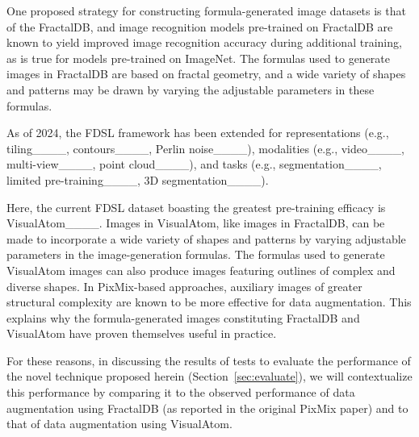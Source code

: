 One proposed strategy for constructing
formula-generated image datasets is that
of the FractalDB, and image recognition
models pre-trained on FractalDB are known to yield improved
image recognition accuracy during additional training,
as is true for models pre-trained on ImageNet.
The formulas used to generate images in FractalDB
are based on fractal geometry, and
a wide variety of shapes and patterns may be drawn
by varying the adjustable parameters in these formulas.

As of 2024, the FDSL framework has been extended for representations (e.g., tiling____, contours____, Perlin noise____), modalities (e.g., video____, multi-view____, point cloud____), and tasks (e.g., segmentation____, limited pre-training____, 3D segmentation____). 

Here, the current FDSL dataset boasting the
greatest pre-training efficacy is VisualAtom____.
Images in VisualAtom, like images in FractalDB,
can be made to incorporate a wide variety
of shapes and patterns by varying adjustable parameters
in the image-generation formulas.
The formulas used to generate VisualAtom images
can also produce images featuring outlines of
complex and diverse shapes.
In PixMix-based approaches,
auxiliary images of greater structural complexity
are known to be more effective for data augmentation.
This explains why the formula-generated images
constituting FractalDB and VisualAtom have proven themselves useful in practice.

For these reasons, in discussing the results of tests to
evaluate the performance of the novel technique proposed
herein (Section~\ref{sec:evaluate}),  we will
contextualize this performance by comparing it
to the observed performance of data augmentation
using FractalDB (as reported in the original PixMix paper)
and to that of data augmentation using VisualAtom.